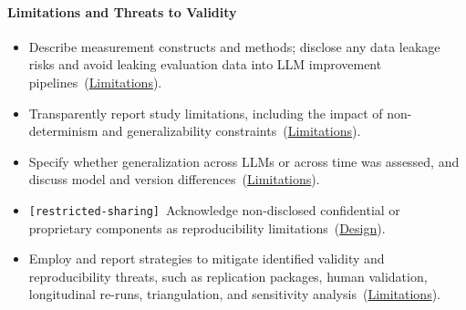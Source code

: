 \documentclass[smallextended]{svjour3}
\makeatletter
\newcommand{\must}{\textbf{must}\xspace}
\newcommand{\should}{\textbf{should}\xspace}
\newcommand{\iconM}{\usebox{\iconMbox}\xspace}
\newcommand{\iconS}{\usebox{\iconSbox}\xspace}
\newcommand{\iconM}{●\xspace}
\newcommand{\iconS}{○\xspace}
\newcommand{\condition}[1]{\texttt{\small[#1]}\,}
\newcommand{\condition}[1]{@@cond:#1@@}
\newcommand{\refdesign}{\hyperref[sec:report-system-and-prompt-design]{Design}}
\newcommand{\reflimitations}{\hyperref[sec:report-limitations-and-mitigations]{Limitations}}
\newcommand{\refdesign}{\href{/guidelines/report-system-and-prompt-design/}{Design}}
\newcommand{\reflimitations}{\href{/guidelines/report-limitations-and-mitigations/}{Limitations}}
\makeatother
\begin{document}
\begin{appendices}
\paragraph{\textbf{Limitations and Threats to Validity}}
\begin{itemize}[label={},leftmargin=*]
    \item \iconM Describe measurement constructs and methods; disclose any data leakage risks and avoid leaking evaluation data into LLM improvement pipelines~(\reflimitations).
    \item \iconM Transparently report study limitations, including the impact of non-determinism and generalizability constraints~(\reflimitations).
    \item \iconM Specify whether generalization across LLMs or across time was assessed, and discuss model and version differences~(\reflimitations).
    \item \iconM \condition{restricted-sharing} Acknowledge non-disclosed confidential or proprietary components as reproducibility limitations~(\refdesign).
    \item \iconS Employ and report strategies to mitigate identified validity and reproducibility threats, such as replication packages, human validation, longitudinal re-runs, triangulation, and sensitivity analysis~(\reflimitations).
\end{itemize}
 
\end{appendices} 
\end{document}
